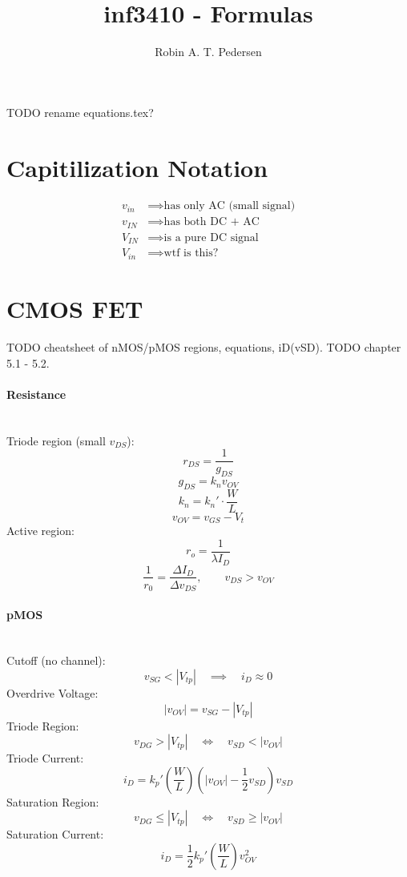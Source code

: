 \documentclass[twocolumn]{article}
\begin{document}
  \title{inf3410 - Formulas}
  \author{Robin A. T. Pedersen}
  \maketitle

  TODO rename equations.tex?

  \section{Capitilization Notation}
    \begin{align}
      v_{in} &\implies \text{has only AC (small signal)} \\
      v_{IN} &\implies \text{has both DC + AC} \\
      V_{IN} &\implies \text{is a pure DC signal} \\
      V_{in} &\implies \text{wtf is this?}
    \end{align}
  \section{CMOS FET}
    TODO cheatsheet of nMOS/pMOS regions, equations, iD(vSD).
    TODO chapter 5.1 - 5.2.

    \paragraph{Resistance} \hfill \\
      Triode region (small $v_{DS}$):
        $$r_{DS} = \frac{1}{g_{DS}}$$
        $$g_{DS} = k_n v_{OV}$$
        $$k_n = k_n' \cdot \frac{W}{L}$$
        $$v_{OV} = v_{GS} - V_t$$
      Active region:
        $$r_o = \frac{1}{\lambda I_D}$$
        $$\frac{1}{r_0} = \frac{\Delta I_D}{\Delta v_{DS}},
          \qquad v_{DS} > v_{OV}$$

    \paragraph{pMOS} \hfill \\
      Cutoff (no channel):
        $$v_{SG} < |V_{tp}| \quad\implies\quad i_D \approx 0$$
      Overdrive Voltage:
        $$|v_{OV}| = v_{SG} - |V_{tp}|$$
      Triode Region:
        $$v_{DG} > |V_{tp}| \quad\Leftrightarrow\quad v_{SD} < |v_{OV}|$$
      Triode Current:
        $$i_D = k_p' \left( \frac{W}{L} \right)
                     \left( |v_{OV}| - \frac{1}{2} v_{SD} \right) v_{SD}$$
      Saturation Region:
        $$v_{DG} \leq |V_{tp}| \quad\Leftrightarrow\quad v_{SD} \geq |v_{OV}|$$
      Saturation Current:
        $$i_D = \frac{1}{2} k_p' \left( \frac{W}{L} \right) v_{OV}^2$$
\end{document}
